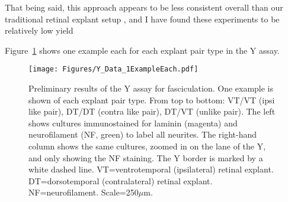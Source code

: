That being said, this approach appears to be less consistent overall than our traditional retinal explant setup
, and I have found these experiments to be relatively low yield

Figure~\ref{Figures/Y_Data_1ExampleEach} shows one example each for each explant pair type in the Y assay.
\begin{figure}[hbtp]
    \begin{center}
        \texttt{[image: Figures/Y\_Data\_1ExampleEach.pdf]}
        \caption[Preliminary results of the Y assay for fasciculation.]
        {Preliminary results of the Y assay for fasciculation.
		One example is shown of each explant pair type.
		From top to bottom: VT/VT (ipsi like pair), DT/DT (contra like pair), DT/VT (unlike pair).
		The left shows cultures immunostained for laminin (magenta) and neurofilament (NF, green) to label all neurites.
		The right-hand column shows the same cultures, zoomed in on the lane of the Y, and only showing the NF staining.
		The Y border is marked by a white dashed line.
		VT=ventrotemporal (ipsilateral) retinal explant.
		DT=dorsotemporal (contralateral) retinal explant.
		NF=neurofilament.
		Scale=250$\mu$m.
		}
        \label{Figures/Y_Data_1ExampleEach}
    \end{center}
\end{figure}